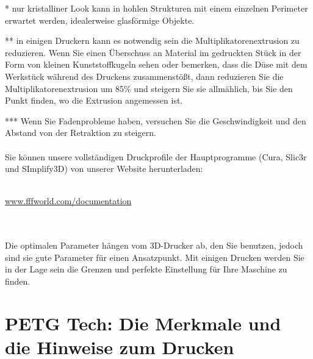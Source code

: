 \documentclass[11pt,a4paper]{article}
\begin{document}
* nur kristalliner Look kann in hohlen Strukturen mit einem einzelnen Perimeter erwartet werden, idealerweise glasförmige Objekte.

** in einigen Druckern kann es notwendig sein die Multiplikatorenextrusion zu reduzieren. Wenn Sie einen Überschuss an Material im gedruckten Stück in der Form von kleinen Kunststoffkugeln sehen oder bemerken, dass die Düse mit dem Werkstück während des Druckens zusammenstößt, dann reduzieren Sie die Multiplikatorenextrusion um 85\% und steigern Sie sie allmählich, bis Sie den Punkt finden, wo die Extrusion angemessen ist.

*** Wenn Sie Fadenprobleme haben, versuchen Sie die Geschwindigkeit und den Abstand von der Retraktion zu steigern.
\\\\
Sie können unsere vollständigen Druckprofile der Hauptprogramme (Cura, Slic3r und SImplify3D) von unserer Website herunterladen:  
\\\\
\centerline{ {\huge \url{www.fffworld.com/documentation} } }
\\\\
Die optimalen Parameter hängen vom 3D-Drucker ab, den Sie benutzen, jedoch sind sie gute Parameter für einen Ansatzpunkt. Mit einigen Drucken werden Sie in der Lage sein die Grenzen und perfekte Einstellung für Ihre Maschine zu finden. 
\section{PETG Tech: Die Merkmale und die Hinweise zum Drucken}
\end{document}
